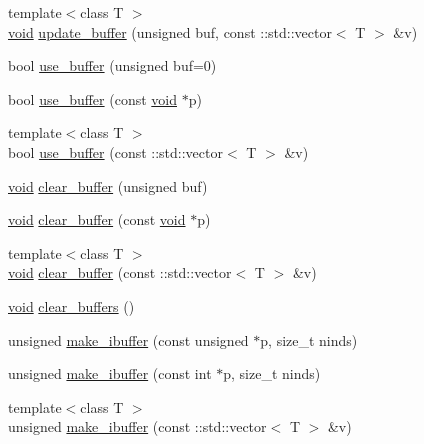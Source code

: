 \begin{DoxyCompactItemize}
\item 
{\footnotesize template$<$class T $>$ }\\\hyperlink{namespacetrimesh_a784ddfd979e1c579bda795a8edfc3f43}{void} \hyperlink{classtrimesh_1_1GLManager_a9773cc6bf61c3307e043a63c3507bdd4}{update\+\_\+buffer} (unsigned buf, const \+::std\+::vector$<$ T $>$ \&v)
\item 
bool \hyperlink{classtrimesh_1_1GLManager_a010d6fb6cd1d01835cf193d537d58407}{use\+\_\+buffer} (unsigned buf=0)
\item 
bool \hyperlink{classtrimesh_1_1GLManager_a859c7442abd7f22cb7afaf2873f85733}{use\+\_\+buffer} (const \hyperlink{namespacetrimesh_a784ddfd979e1c579bda795a8edfc3f43}{void} $\ast$p)
\item 
{\footnotesize template$<$class T $>$ }\\bool \hyperlink{classtrimesh_1_1GLManager_ac2b09bdc80ad94565239100197c13229}{use\+\_\+buffer} (const \+::std\+::vector$<$ T $>$ \&v)
\item 
\hyperlink{namespacetrimesh_a784ddfd979e1c579bda795a8edfc3f43}{void} \hyperlink{classtrimesh_1_1GLManager_a70984a41840187556a53bc9d947a70fc}{clear\+\_\+buffer} (unsigned buf)
\item 
\hyperlink{namespacetrimesh_a784ddfd979e1c579bda795a8edfc3f43}{void} \hyperlink{classtrimesh_1_1GLManager_a6ad60a5c139d59ae95c5838a1d0dc632}{clear\+\_\+buffer} (const \hyperlink{namespacetrimesh_a784ddfd979e1c579bda795a8edfc3f43}{void} $\ast$p)
\item 
{\footnotesize template$<$class T $>$ }\\\hyperlink{namespacetrimesh_a784ddfd979e1c579bda795a8edfc3f43}{void} \hyperlink{classtrimesh_1_1GLManager_ab44739ffc0410aadae36f2b077779c3c}{clear\+\_\+buffer} (const \+::std\+::vector$<$ T $>$ \&v)
\item 
\hyperlink{namespacetrimesh_a784ddfd979e1c579bda795a8edfc3f43}{void} \hyperlink{classtrimesh_1_1GLManager_aa93fa1f5e242c99758f24e83f656b587}{clear\+\_\+buffers} ()
\item 
unsigned \hyperlink{classtrimesh_1_1GLManager_a083c9ca0d60f91c19fe90748af2419c3}{make\+\_\+ibuffer} (const unsigned $\ast$p, size\+\_\+t ninds)
\item 
unsigned \hyperlink{classtrimesh_1_1GLManager_a23cc42a344571030f58c58da9e518bd9}{make\+\_\+ibuffer} (const int $\ast$p, size\+\_\+t ninds)
\item 
{\footnotesize template$<$class T $>$ }\\unsigned \hyperlink{classtrimesh_1_1GLManager_a934c34d8f2f07457c53d225af87188fb}{make\+\_\+ibuffer} (const \+::std\+::vector$<$ T $>$ \&v)

\end{DoxyCompactItemize}
